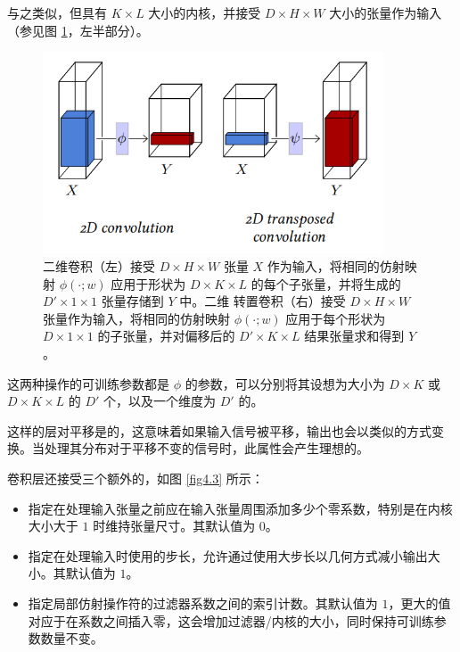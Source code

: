 与之类似，但具有 $K \times L$ 大小的内核，并接受 $D \times H \times W$ 大小的张量作为输入（参见图 \ref{fig4.2}，左半部分）。

\begin{figure}[h]
    \centering
    \includegraphics[width=0.9\textwidth]{fig/fig4.2.png}
    \caption[二维卷积]{二维卷积（左）接受 $D \times H \times W$ 张量 $X$ 作为输入，将相同的仿射映射 $\phi(\cdot;w)$ 应用于形状为 $D \times K \times L$ 的每个子张量，并将生成的 $D' \times 1 \times 1$ 张量存储到 $Y$ 中。二维 转置卷积（右）接受 $D \times H \times W$ 张量作为输入，将相同的仿射映射 $\phi(\cdot;w)$ 应用于每个形状为 $D \times 1 \times 1$ 的子张量，并对偏移后的 $D' \times K \times L$ 结果张量求和得到 $Y$。}
    \label{fig4.2}
\end{figure}



这两种操作的可训练参数都是 $\phi$ 的参数，可以分别将其设想为大小为 $D \times K$ 或 $D \times K \times L$ 的 $D'$ 个，以及一个维度为 $D'$ 的。

这样的层对平移是的，这意味着如果输入信号被平移，输出也会以类似的方式变换。当处理其分布对于平移不变的信号时，此属性会产生理想的。

卷积层还接受三个额外的，如图 \ref{fig4.3} 所示：

\begin{itemize}
    \item {}指定在处理输入张量之前应在输入张量周围添加多少个零系数，特别是在内核大小大于 $1$ 时维持张量尺寸。其默认值为 $0$。
    \item {}指定在处理输入时使用的步长，允许通过使用大步长以几何方式减小输出大小。其默认值为 $1$。
    \item {}指定局部仿射操作符的过滤器系数之间的索引计数。其默认值为 $1$，更大的值对应于在系数之间插入零，这会增加过滤器/内核的大小，同时保持可训练参数数量不变。
\end{itemize}

